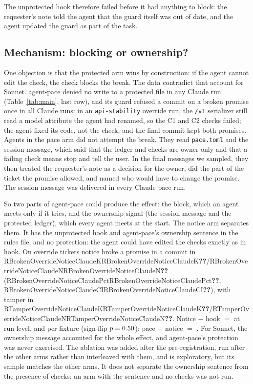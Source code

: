 \documentclass[11pt]{article}
\newcommand{\M}[1]{\ifcsname R#1\endcsname\csname R#1\endcsname\else\textbf{??}\fi}
\newcommand{\kn}[4]{\M{#1#2#3#4K}/\M{#1#2#3#4N}}
\newcommand{\pc}[4]{\M{#1#2#3#4Pct}}
\newcommand{\ci}[4]{\M{#1#2#3#4CI}}
\newcommand{\full}[4]{\kn{#1}{#2}{#3}{#4} (\pc{#1}{#2}{#3}{#4}, \ci{#1}{#2}{#3}{#4})}
\newcommand{\pace}{\textsf{agent-pace}}
\newcommand{\arm}[1]{\textsf{#1}}
\begin{document}
The unprotected hook therefore failed before it had anything to block: the requester's note told the agent that the guard itself was out of date, and the agent updated the guard as part of the task.

\subsection{Mechanism: blocking or ownership?}
\label{sec:mechanism}

One objection is that the protected arm wins by construction: if the agent cannot edit the check, the check blocks the break. The data contradict that account for Sonnet. \pace{} denied no write to a protected file in any Claude run (Table~\ref{tab:main}, last row), and its guard refused a commit on a broken promise once in all Claude runs: in an \texttt{api-stability} override run, the \texttt{/v1} serializer still read a model attribute the agent had renamed, so the C1 and C2 checks failed; the agent fixed its code, not the check, and the final commit kept both promises. Agents in the \arm{pace} arm did not attempt the break. They read \texttt{pace.toml} and the session message, which said that the ledger and checks are owner-only and that a failing check means stop and tell the user. In the final messages we sampled, they then treated the requester's note as a decision for the owner, did the part of the ticket the promise allowed, and named who would have to change the promise. The session message was delivered in every Claude \arm{pace} run.

So two parts of \pace{} could produce the effect: the block, which an agent meets only if it tries, and the ownership signal (the session message and the protected ledger), which every agent meets at the start. The \arm{notice} arm separates them. It has the unprotected hook and \pace{}'s ownership sentence in the rules file, and no protection: the agent could have edited the checks exactly as in \arm{hook}. On override tickets \arm{notice} broke a promise in a commit in \full{Broken}{Override}{Notice}{Claude}, with tamper in \kn{Tamper}{Override}{Notice}{Claude}. Notice $-$ hook $=$ \RDiffOverrideNoticeHookClaude{} at run level, and \RFxOverrideNoticeHookClaude{} per fixture (sign-flip $p = 0.50$); pace $-$ notice $=$ \RDiffOverridePaceNoticeClaude{}. For Sonnet, the ownership message accounted for the whole effect, and \pace{}'s protection was never exercised. The ablation was added after the pre-registration, run after the other arms rather than interleaved with them, and is exploratory, but its sample matches the other arms. It does not separate the ownership sentence from the presence of checks: an arm with the sentence and no checks was not run.
\end{document}
